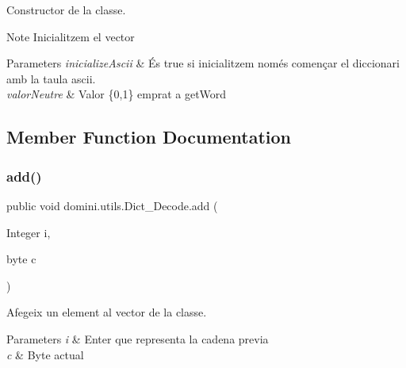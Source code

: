 Constructor de la classe. 

\begin{DoxyNote}{Note}
Inicialitzem el vector 
\end{DoxyNote}

\begin{DoxyParams}{Parameters}
{\em inicialize\+Ascii} & És true si inicialitzem només començar el diccionari amb la taula ascii. \\
\hline
{\em valor\+Neutre} & Valor \{0,1\} emprat a get\+Word \\
\hline
\end{DoxyParams}


\subsection{Member Function Documentation}
\mbox{\label{classdomini_1_1utils_1_1Dict__Decode_a077011e4507db308d143ea9b7146abb9}} 
\subsubsection{\texorpdfstring{add()}{add()}}
{\footnotesize\ttfamily public void domini.\+utils.\+Dict\+\_\+\+Decode.\+add (\begin{DoxyParamCaption}\item[{Integer}]{i,  }\item[{byte}]{c }\end{DoxyParamCaption})\hspace{0.3cm}{\ttfamily [inline]}}



Afegeix un element al vector de la classe. 


\begin{DoxyParams}{Parameters}
{\em i} & Enter que representa la cadena previa \\
\hline
{\em c} & Byte actual \\
\hline
\end{DoxyParams}
\mbox{\label{classdomini_1_1utils_1_1Dict__Decode_aac69020c3515649e8c2d70e2908e3f3e}} 
